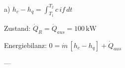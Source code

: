 a)  
\( h_c - h_q = \int_{T_1}^{T_2} c \, if \, dt \)  

Zustand:  
\( \dot{Q}_R = \dot{Q}_{aus} = 100 \, \text{kW} \)  

Energiebilanz:  
\( 0 = \dot{m} \, [h_c - h_q] + \dot{Q}_{aus} \)  

---